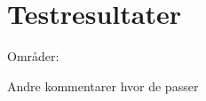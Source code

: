 \chapter{Testresultater}
\label{TestresultaterSocialAccept}
%
Områder:






Andre kommentarer hvor de passer 





